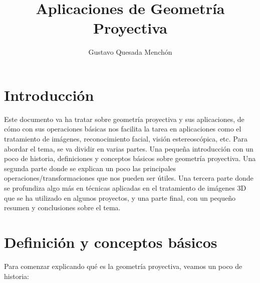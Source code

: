 \documentclass[a4,10pt]{article}
\begin{document}
\title{\textbf{Aplicaciones de Geometría Proyectiva}}
\author{Gustavo Quesada Menchón}
\date{}
\maketitle
\newpage
\tableofcontents
\newpage

\section{Introducción}

Este documento va ha tratar sobre geometría proyectiva y sus aplicaciones, de cómo con sus operaciones básicas nos facilita la tarea en aplicaciones como el tratamiento de imágenes, reconocimiento facial, visión estereoscópica, etc. Para abordar el tema, se va dividir en varias partes. Una pequeña introducción con un poco de historia, definiciones y conceptos básicos sobre geometría proyectiva. Una segunda parte donde se explican un poco las principales operaciones/transformaciones que nos pueden ser útiles. Una tercera parte donde se profundiza algo más en técnicas aplicadas en el tratamiento de imágenes 3D que se ha utilizado en algunos proyectos, y una parte final, con un pequeño resumen y conclusiones sobre el tema.


\section {Definición y conceptos básicos}

Para comenzar explicando qué es la geometría proyectiva, veamos un poco de historia:
\end{document}
